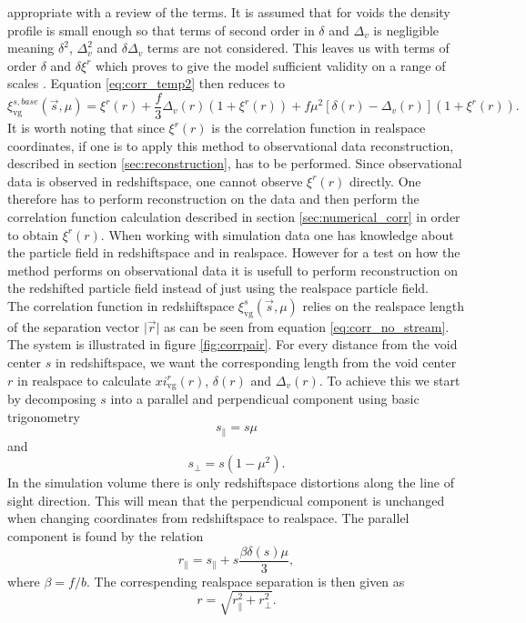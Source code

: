 appropriate with a review of the terms. It is
assumed that for voids the density profile is small enough so that terms of
second order in $\delta$ and $\Delta_{v}$ is negligible meaning $\delta^2$,
$\Delta_{v}^2$ and $\delta\Delta_v$ terms are not considered. This leaves us with terms
of order $\delta$ and  $\delta\xi^r$ which proves to give
the model sufficient validity on a range of scales \cite{BeyondBAO}. Equation
\ref{eq:corr_temp2} then reduces to
\begin{equation}\label{eq:corr_no_stream}
    \xi^{s,base}_{\mathrm{vg}}(\vec{s},\mu)=\xi^r(r)+\frac{f}{3}\Delta_v(r)(1+\xi^r(r))+f\mu^2[\delta(r)-\Delta_v(r)](1+\xi^r(r)).
\end{equation}
It is worth noting that since $\xi^r(r)$ is the correlation function in
realspace coordinates, if one is to apply this method to observational data
reconstruction, described in section \ref{sec:reconstruction}, has to be performed. Since observational data is observed in
redshiftspace, one cannot observe $\xi^r(r)$ directly. One therefore has to
perform reconstruction on the data and then perform the correlation function
calculation described in section \ref{sec:numerical_corr} in order to obtain
$\xi^r(r)$. When working with simulation data one has knowledge about the
particle field in redshiftspace and in realspace. However for a test on how the
method performs on observational data it is usefull to perform reconstruction on
the redshifted particle field instead of just using the realspace particle
field.
\\\indent
The correlation function in redshiftspace $\xi^s_{\mathrm{vg}}(\vec{s},\mu)$
relies on the realspace length of the separation vector $\vert\vec{r}\vert$ as
can be seen from equation \ref{eq:corr_no_stream}. The system is illustrated in
figure \ref{fig:corrpair}. For every distance from the void center $s$ in
redshiftspace, we want the corresponding length from the void center $r$ in
realspace to calculate $xi^r_{\mathrm{vg}}(r)$, $\delta(r)$ and $\Delta_v(r)$.
To achieve this we start by decomposing $s$ into a parallel and perpendicual
component using basic trigonometry
\begin{equation}
    s_\parallel=s\mu
\end{equation}
and
\begin{equation}
    s_\perp=s(1-\mu^2).
\end{equation}
In the simulation volume there is only redshiftspace distortions along the line
of sight direction. This will mean that the perpendicual component is unchanged
when changing coordinates from redshiftspace to realspace. The parallel
component is found by the relation
\begin{equation}
    r_\parallel=s_\parallel + s\frac{\beta\delta(s)\mu}{3},
\end{equation}
where $\beta=f/b$.
The correspending realspace separation is then given as
\begin{equation}
    r=\sqrt{r_\parallel^2+r_\perp^2}.
\end{equation}
